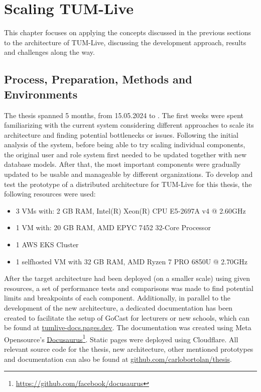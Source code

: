 
\chapter{Scaling TUM-Live}\label{chapter:scaling_tumlive}

This chapter focuses on applying the concepts discussed in the previous sections to the architecture of TUM-Live, discussing the development approach, results and challenges along the way. 

\section{Process, Preparation, Methods and Environments}

The thesis spanned 5 months, from 15.05.2024 to \getSubmissionDate{}. The first weeks were spent familiarizing with the current system considering different approaches to scale its architecture and finding potential bottlenecks or issues. Following the initial analysis of the system, before being able to try scaling individual components, the original user and role system first needed to be updated together with new database models. After that, the most important components were gradually updated to be usable and manageable by different organizations. 
To develop and test the prototype of a distributed architecture for TUM-Live for this thesis, the following resources were used:
\begin{itemize}
    \item 3 \ac{VM}s with: 2 GB RAM, Intel(R) Xeon(R) CPU E5-2697A v4 @ 2.60GHz
    \item 1 \ac{VM} with: 20 GB RAM, AMD EPYC 7452 32-Core Processor
    \item 1 \ac{AWS} \ac{EKS} Cluster
    \item 1 selfhosted \ac{VM} with 32 GB RAM, AMD Ryzen 7 PRO 6850U @ 2.70GHz
\end{itemize}

\noindent After the target architecture had been deployed (on a smaller scale) using given resources, a set of performance tests and comparisons was made to find potential limits and breakpoints of each component. 
Additionally, in parallel to the development of the new architecture, a dedicated documentation has been created to facilitate the setup of GoCast for lecturers or new schools, which can be found at \href{https://tumlive-docs.pages.dev/}{tumlive-docs.pages.dev}. The documentation was created using Meta Opensource's \href{https://github.com/facebook/docusaurus}{Docusaurus}\footnote{\url{https://github.com/facebook/docusaurus}}. Static pages were deployed using Cloudflare.
All relevant source code for the thesis, new architecture, other mentioned prototypes and documentation can also be found at \href{https://github.com/carlobortolan/thesis}{github.com/carlobortolan/thesis}.


